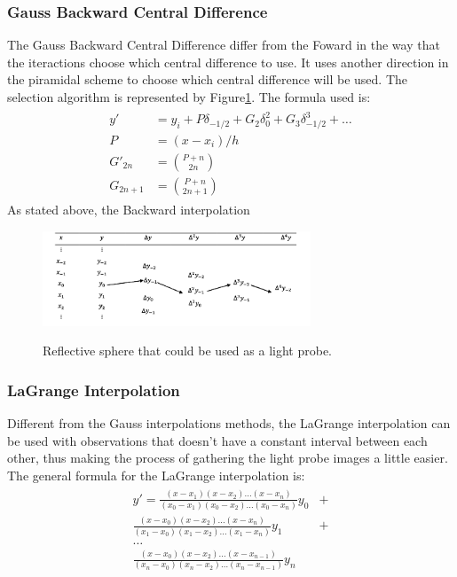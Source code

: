 \documentclass[conference]{acmsiggraph}
\begin{document}
\subsubsection{Gauss Backward Central Difference}
	The Gauss Backward Central Difference differ from the Foward in the way that the iteractions choose which central difference to use. 
It uses another direction in the piramidal scheme to choose which central difference will be used. The selection algorithm is represented 
by Figure\ref{fig:backwardcentral}. The formula used is:
\begin{align}
\begin{split}
	y' &= y_i + P \delta_{-1/2} + G_2 \delta_0^2 + G_3 \delta_{-1/2}^3 + \dots\\
	P &= (x-x_i)/h \\
	G'_{2n} &= \binom{P+n}{2n} \\
	G_{2n+1} &= \binom{P+n}{2n+1}
\end{split}
\end{align}
	As stated above, the Backward interpolation 

\begin{figure}[H]
	\caption{Reflective sphere that could be used as a light probe.}
	\centering
	\includegraphics[width=08cm]{images/backward.png}
	\label{fig:backwardcentral}
\end{figure}

\subsubsection{LaGrange Interpolation}
	Different from the Gauss interpolations methods, the LaGrange interpolation can be used with observations that doesn't have a constant interval between 
each other, thus making the process of gathering the light probe images a little easier. The general formula for the LaGrange interpolation is:
\begin{align}
\begin{split}
	y' = \frac{(x-x_1)(x-x_2)\dots(x-x_n)}{(x_0-x_1)(x_0-x_2)\dots(x_0-x_n)}y_0 &+ \\
		 \frac{(x-x_0)(x-x_2)\dots(x-x_n)}{(x_1-x_0)(x_1-x_2)\dots(x_1-x_n)}y_1 &+ \\
		 \dots &\\
		 \frac{(x-x_0)(x-x_2)\dots(x-x_{n-1})}{(x_n-x_0)(x_n-x_2)\dots(x_n-x_{n-1})}y_n &
\end{split}
\end{align}
\end{document}
